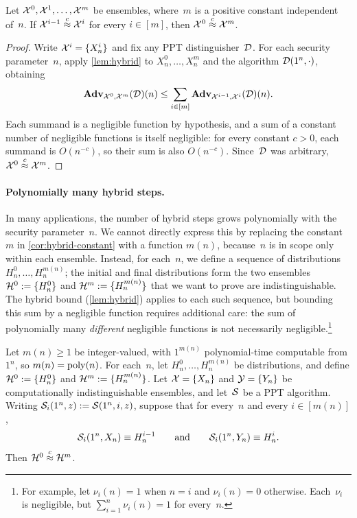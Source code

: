 \documentclass[11pt]{article}
\begin{document}
\begin{corollary}
  \label{cor:hybrid-constant}
  Let $\mathcal{X}^0,\mathcal{X}^{1},\ldots,\mathcal{X}^m$ be ensembles, where~$m$ is a positive constant independent of~$n$.
  If $\mathcal{X}^{i-1}\stackrel{c}{\approx}\mathcal{X}^i$ for every $i\in[m]$, then $\mathcal{X}^0\stackrel{c}{\approx}\mathcal{X}^m$.
\end{corollary}

\begin{proof}
  Write $\mathcal{X}^i=\{X^i_n\}$ and fix any PPT distinguisher~$\mathcal{D}$.
  For each security parameter~$n$, apply \cref{lem:hybrid} to $X^0_n,\ldots,X^m_n$ and the algorithm $\mathcal{D}(1^n,\cdot)$, obtaining
  \[
    \mathbf{Adv}_{\mathcal{X}^0,\mathcal{X}^m}(\mathcal{D})(n)
    \leq\sum_{i\in[m]}\mathbf{Adv}_{\mathcal{X}^{i-1},\mathcal{X}^i}(\mathcal{D})(n)\text.
  \]
  Each summand is a negligible function by hypothesis, and a sum of a constant number of negligible functions is itself negligible: for every constant $c>0$, each summand is $O(n^{-c})$, so their sum is also $O(n^{-c})$.
  Since~$\mathcal{D}$ was arbitrary, $\mathcal{X}^0\stackrel{c}{\approx}\mathcal{X}^m$.
\end{proof}

\paragraph{Polynomially many hybrid steps.}

In many applications, the number of hybrid steps grows polynomially with the security parameter~$n$.
We cannot directly express this by replacing the constant~$m$ in \cref{cor:hybrid-constant} with a function $m(n)$, because~$n$ is in scope only within each ensemble.
Instead, for each~$n$, we define a sequence of distributions $H^0_n,\ldots,H^{m(n)}_n$; the initial and final distributions form the two ensembles $\mathcal{H}^0:=\{H^0_n\}$ and $\mathcal{H}^m:=\{H^{m(n)}_n\}$ that we want to prove are indistinguishable.
The hybrid bound (\cref{lem:hybrid}) applies to each such sequence, but bounding this sum by a negligible function requires additional care: the sum of polynomially many \emph{different} negligible functions is not necessarily negligible.\footnote{For example, let $\nu_i(n)=1$ when $n=i$ and $\nu_i(n)=0$ otherwise.
  Each~$\nu_i$ is negligible, but $\sum_{i=1}^n\nu_i(n)=1$ for every~$n$.}

\begin{corollary}
  \label{cor:hybrid-polynomial}
  Let $m(n)\geq1$ be integer-valued, with $1^{m(n)}$ polynomial-time computable from $1^n$, so $m(n)=\operatorname{poly}(n)$.
  For each~$n$, let $H^0_n,\ldots,H^{m(n)}_n$ be distributions, and define $\mathcal{H}^0:=\{H^0_n\}$ and $\mathcal{H}^m:=\{H^{m(n)}_n\}$.
  Let $\mathcal{X}=\{X_n\}$ and $\mathcal{Y}=\{Y_n\}$ be computationally indistinguishable ensembles, and let~$\mathcal{S}$ be a PPT algorithm.
  Writing $\mathcal{S}_i(1^n,z):=\mathcal{S}(1^n,i,z)$, suppose that for every~$n$ and every $i\in[m(n)]$,
  \begin{equation}
    \label{eq:hybrid-simulator-identities}
    \mathcal{S}_i(1^n,X_n)\equiv H^{i-1}_n
    \qquad\text{and}\qquad
    \mathcal{S}_i(1^n,Y_n)\equiv H^i_n\text.
  \end{equation}
  Then $\mathcal{H}^0\stackrel{c}{\approx}\mathcal{H}^m$.
\end{corollary}
\end{document}
